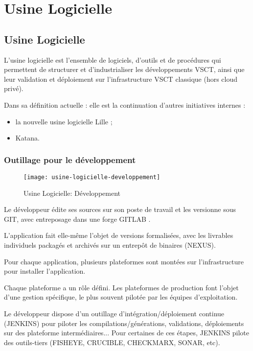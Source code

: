 \section{Usine Logicielle}

\subsection{Usine Logicielle}
L'usine logicielle est l'ensemble de logiciels, d'outils et de procédures qui permettent de structurer et d'industrialiser les développements VSCT,
ainsi que leur validation et déploiement sur l'infrastructure VSCT classique (hors cloud privé).

Dans sa définition actuelle :
elle est la continuation d'autres initiatives internes :
\begin{itemize}
  \item la nouvelle usine logicielle Lille ;
  \item Katana.
\end{itemize}

\subsubsection{Outillage pour le développement}

\begin{figure}[ht]
 \centering
 \texttt{[image: usine-logicielle-developpement]}
 \caption{Usine Logicielle: Développement}
\end{figure}

Le développeur édite ses sources sur son poste de travail et les versionne sous GIT, avec entreposage dans une forge GITLAB .

L'application fait elle-même l'objet de versions formalisées, avec les livrables individuels packagés et archivés sur un entrepôt de binaires (NEXUS).

Pour chaque application, plusieurs plateformes sont montées sur l'infrastructure pour installer l'application.

Chaque plateforme a un rôle défini. Les plateformes de production font l'objet d'une gestion spécifique, le plus souvent pilotée par les équipes d'exploitation.

Le développeur dispose d'un outillage d'intégration/déploiement continue (JENKINS) pour piloter les compilations/générations, validations, déploiements sur des plateforme intermédiaires...
Pour certaines de ces étapes, JENKINS pilote des outils-tiers (FISHEYE, CRUCIBLE, CHECKMARX, SONAR, etc).

